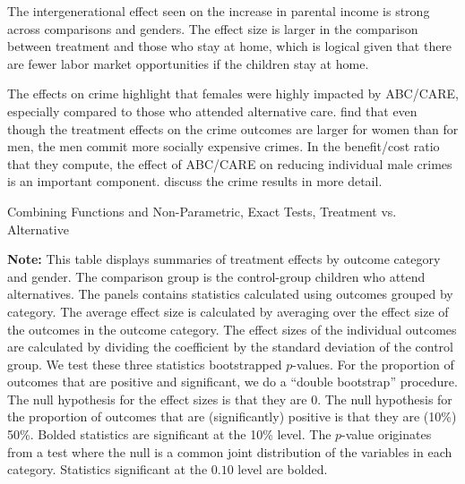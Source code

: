 The intergenerational effect seen on the increase in parental income is strong across comparisons and genders. The effect size is larger in the comparison between treatment and those who stay at home, which is logical given that there are fewer labor market opportunities if the children stay at home. 

The effects on crime highlight that females were highly impacted by ABC/CARE, especially compared to those who attended alternative care. \citet{Garcia_Heckman_Leaf_etal_2017_Comp_CBA_Unpublished} find that even though the treatment effects on the crime outcomes are larger for women than for men, the men commit more socially expensive crimes. In the benefit/cost ratio that they compute, the effect of ABC/CARE on reducing individual male crimes is an important component. \citet{Garcia_etal_2019_ECE_IMHJ} discuss the crime results in more detail.

\begin{table}[!htpb]
\begin{threeparttable}
\caption{Combining Functions and Non-Parametric, Exact Tests, Treatment vs. Alternative} \label{table:massivealt}
\centering
  
\begin{tablenotes}
\footnotesize
\item \footnotesize \textbf{Note:} This table displays summaries of treatment effects by outcome category and gender. The comparison group is the control-group children who attend alternatives. The panels contains statistics calculated using outcomes grouped by category. The average effect size is calculated by averaging over the effect size of the outcomes in the outcome category. The effect sizes of the individual outcomes are calculated by dividing the coefficient by the standard deviation of the control group. We test these three statistics bootstrapped $p$-values. For the proportion of outcomes that are positive and significant, we do a ``double bootstrap'' procedure. The null hypothesis for the effect sizes is that they are 0. The null hypothesis for the proportion of outcomes that are (significantly) positive is that they are (10\%) 50\%. Bolded statistics are significant at the 10\% level. The \citet{Rosenbaum_2005_Distribution_JRSS} $p$-value originates from a test where the null is a common joint distribution of the variables in each category. Statistics significant at the $0.10$ level are bolded.
\end{tablenotes}
\end{threeparttable}
\end{table}

